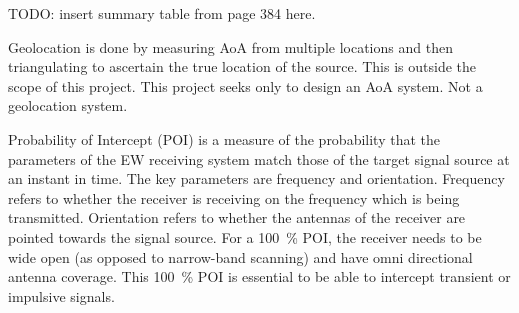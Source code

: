 TODO: insert summary table from page 384 here.

Geolocation is done by measuring AoA from multiple locations and then triangulating to ascertain the true location of the source. This is outside the scope of this project. This project seeks only to design an AoA system. Not a geolocation system. 

Probability of Intercept (POI) is a measure of the probability that the parameters of the EW receiving system match those of the target signal source at an instant in time. The key parameters are frequency and orientation. Frequency refers to whether the receiver is receiving on the frequency which is being transmitted. Orientation refers to whether the antennas of the receiver are pointed towards the signal source. 
For a \SI{100}{\percent} POI, the receiver needs to be wide open (as opposed to narrow-band scanning) and have omni directional antenna coverage. This \SI{100}{\percent} POI is essential to be able to intercept transient or impulsive signals.
